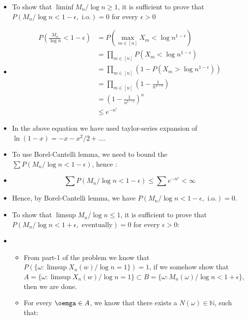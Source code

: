 \documentclass{article}
\newcommand{\bracket}[1]{\left(#1\right)}
\begin{document}
\begin{itemize}
    \item To show that $\liminf{{M_n/\log{n}}} \geq 1$, it is sufficient to prove that $P({M_n/\log{n}} < 1-\epsilon, \, \, \text{i.o.}) = 0$ for every $\epsilon > 0$
    \item[] \begin{equation}
                \begin{split}
                    P\bracket{\frac{M_n}{\log{n}} < 1-\epsilon} &= P\bracket{\max_{m\in[n]} X_m < \log{n^{1-\epsilon}}}\\
                    &= \prod_{m\in[n]}P\bracket{X_m < \log{n^{1-\epsilon}}}\\
                    &= \prod_{m\in[n]}\left(1 - P\bracket{X_m > \log{n^{1-\epsilon}}}\right)\\
                    &= \prod_{m\in[n]}\left(1 - \frac{1}{n^{1-\epsilon}}\right)\\
                    &= \left(1 - \frac{1}{n^{1-\epsilon}}\right)^n\\
                    &\leq e^{-n^\epsilon}
                \end{split}
            \end{equation}
    \item[] In the above equation we have used taylor-series expansion of $\ln{(1-x)} = -x - x^2/2 + \dots$. 
    \item To use Borel-Cantelli lemma, we need to bound the $ \sum P(M_n/\log{n} < 1-\epsilon)$, hence : 
    \item[] \begin{equation}
                \sum P(M_n/\log{n} < 1-\epsilon) \leq \sum e^{-n^\epsilon} < \infty
            \end{equation}
    \item Hence, by Borel-Cantelli lemma, we have $P({M_n/\log{n}} < 1-\epsilon, \, \, \text{i.o.}) = 0$. 
    \item To show that $\limsup{{M_n/\log{n}}} \leq 1$, it is sufficient to prove that $P({M_n/\log{n}} < 1+\epsilon, \, \, \text{eventually}) = 0$ for every $\epsilon > 0$:
    \item[] \begin{itemize}
                \item From part-1 of the problem we know that $P(\{\omega : \limsup{X_n(w)/\log{n}} = 1\}) = 1$, if we somehow show that $ A = \{\omega : \limsup{X_n(w)/\log{n}} = 1\} \subset B = \{\omega : M_n(\omega)/\log{n} < 1 + \epsilon\}$, then we are done. 
                \item For every $\oemga \in A$, we know that there exists a $N(\omega) \in \mathbb{N}$, such that: 

\end{itemize}
\end{itemize}
\end{document}

